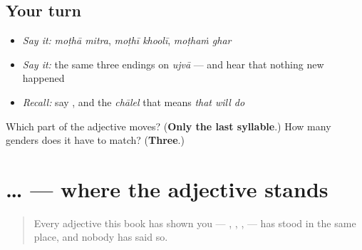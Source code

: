 \subsection*{Your turn}
\begin{itemize}
\raggedright
  \item \emph{Say it:} \emph{moṭhā mitra}, \emph{moṭhī khoolī}, \emph{moṭhaṁ ghar}
  \item \emph{Say it:} the same three endings on \emph{ujvā} — and hear that nothing new happened
  \item \emph{Recall:} say \textbf{}, and the \emph{chālel} that means \emph{that will do}
\end{itemize}

\begin{tcolorbox}[breakable,colback=teal!4,colframe=teal!35!black,title={Before you move on}]
Which part of the adjective moves? (\textbf{Only the last syllable}.) How many genders does it have to match? (\textbf{Three}.)
\end{tcolorbox}
\section[\texorpdfstring{\mr{मोठं} … \mr{आहे} (moṭhaṁ … āhe)}{मोठं … आहे (moṭhaṁ … āhe)}]{ …  — where the adjective stands}

\label{lesson:MR-C49-adj-prenominal}



\begin{quote}
Every adjective this book has shown you — \textbf{}, \textbf{}, \textbf{}, \textbf{} — has stood in the same place, and nobody has said so.
\end{quote}

